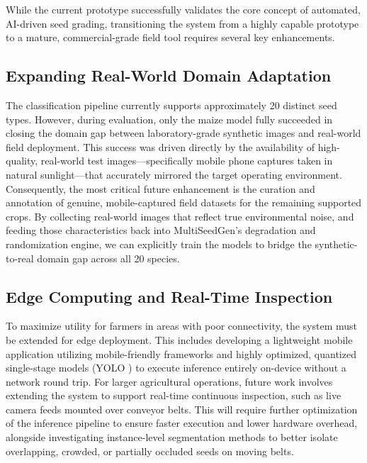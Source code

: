 While the current prototype successfully validates the core concept of automated, AI-driven seed grading, transitioning the system from a highly capable prototype to a mature, commercial-grade field tool requires several key enhancements.

\subsection{Expanding Real-World Domain Adaptation}
The classification pipeline currently supports approximately 20 distinct seed types. However, during evaluation, only the maize model fully succeeded in closing the domain gap between laboratory-grade synthetic images and real-world field deployment. This success was driven directly by the availability of high-quality, real-world test images—specifically mobile phone captures taken in natural sunlight—that accurately mirrored the target operating environment. Consequently, the most critical future enhancement is the curation and annotation of genuine, mobile-captured field datasets for the remaining supported crops. By collecting real-world images that reflect true environmental noise, and feeding those characteristics back into MultiSeedGen's degradation and randomization engine, we can explicitly train the models to bridge the synthetic-to-real domain gap across all 20 species.

\subsection{Edge Computing and Real-Time Inspection}
To maximize utility for farmers in areas with poor connectivity, the system must be extended for edge deployment. This includes developing a lightweight mobile application utilizing mobile-friendly frameworks \cite{reactnativeexpo} and highly optimized, quantized single-stage models (YOLO \cite{redmon2016yolo, yolov8}) to execute inference entirely on-device without a network round trip. For larger agricultural operations, future work involves extending the system to support real-time continuous inspection, such as live camera feeds mounted over conveyor belts. This will require further optimization of the inference pipeline to ensure faster execution and lower hardware overhead, alongside investigating instance-level segmentation methods to better isolate overlapping, crowded, or partially occluded seeds on moving belts.

